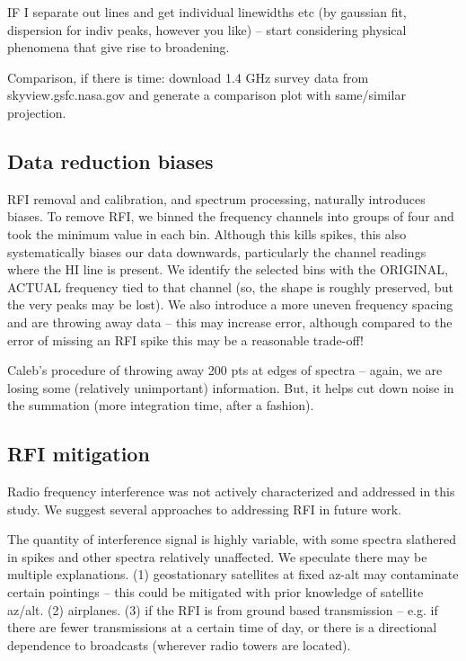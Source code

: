 \documentclass[10pt]{article}
\begin{document}
IF I separate out lines and get individual linewidths etc (by gaussian fit, dispersion for indiv peaks, however you like) -- start considering physical phenomena that give rise to broadening.

Comparison, if there is time: download 1.4 GHz survey data from skyview.gsfc.nasa.gov and generate a comparison plot with same/similar projection.

\subsection{Data reduction biases}

RFI removal and calibration, and spectrum processing, naturally introduces biases.  To remove RFI, we binned the frequency channels into groups of four and took the minimum value in each bin.  Although this kills spikes, this also systematically biases our data downwards, particularly the channel readings where the HI line is present.  We identify the selected bins with the ORIGINAL, ACTUAL frequency tied to that channel (so, the shape is roughly preserved, but the very peaks may be lost).  We also introduce a more uneven frequency spacing and are throwing away data -- this may increase error, although compared to the error of missing an RFI spike this may be a reasonable trade-off!

Caleb's procedure of throwing away 200 pts at edges of spectra -- again, we are losing some (relatively unimportant) information.  But, it helps cut down noise in the summation (more integration time, after a fashion).

\subsection{RFI mitigation}

Radio frequency interference was not actively characterized and addressed in this study.  We suggest several approaches to addressing RFI in future work.

The quantity of interference signal is highly variable, with some spectra slathered in spikes and other spectra relatively unaffected.  We speculate there may be multiple explanations.  (1) geostationary satellites at fixed az-alt may contaminate certain pointings -- this could be mitigated with prior knowledge of satellite az/alt. (2) airplanes.  (3) if the RFI is from ground based transmission -- e.g. if there are fewer transmissions at a certain time of day, or there is a directional dependence to broadcasts (wherever radio towers are located).
\end{document}
